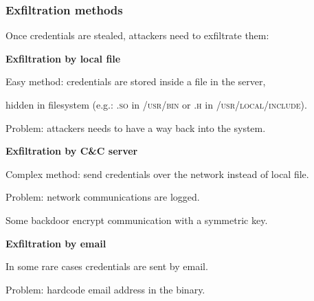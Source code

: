 \begin{frame}
	\frametitle{Exfiltration methods}
	
	Once credentials are stealed, attackers need to exfiltrate them:
	
	\bigskip

	\textbf{Exfiltration by local file}
	
	\smallskip
	
	Easy method: credentials are stored inside a file in the server,
	
	hidden in filesystem (e.g.: \textsc{.so} in \textsc{/usr/bin} or \textsc{.h} in \textsc{/usr/local/include}).
	
	Problem: attackers needs to have a way back into the system.
	
	\bigskip

	\textbf{Exfiltration by C\&C server}
	
	\smallskip
	
	Complex method: send credentials over the network instead of local file.
	
	Problem: network communications are logged.
	
	Some backdoor encrypt communication with a symmetric key.
	
	\bigskip

	\textbf{Exfiltration by email}

	\smallskip
	
	In some rare cases credentials are sent by email.
	
	Problem: hardcode email address in the binary.
	
	\bigskip
	
	
\end{frame}


